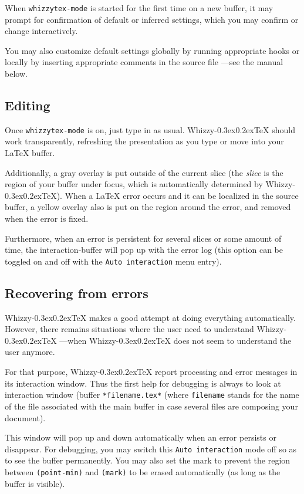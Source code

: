 \documentclass{article}
\makeatletter
\let \lst \verb
\def \whizzy {{Whizzy\kern -0.3ex\raise 0.2ex\hbox{\let \@\relax\TeX}}}
\makeatother
\begin{document}
When {\tt whizzytex-mode} is started for the first time on a new buffer, it
may prompt for confirmation of default or inferred settings, which you may
confirm or change interactively. 

You may also customize default settings globally by running appropriate
hooks or locally by inserting appropriate comments in the source file ---see
the manual below.

\subsection {Editing}

Once {\tt whizzytex-mode} is on, just type in as usual.  {\whizzy} should work
transparently, refreshing the presentation as you type or move into your
{\LaTeX} buffer. 

Additionally, a gray overlay is put outside of the current slice (the {\em
slice} is the region of your buffer under focus, which is automatically
determined by {\whizzy}). When a {\LaTeX} error occurs and it can be
localized in the source buffer, a yellow overlay also is put on the region
around the error, and removed when the error is fixed.

Furthermore, when an error is persistent for several slices or some amount
of time, the interaction-buffer will pop up with the error log
(this option can be toggled on and off with the {\tt Auto interaction} menu
entry).  

\subsection {Recovering from errors}

{\whizzy} makes a good attempt at doing everything automatically. 
However, there remains situations where the user need to understand 
{\whizzy} ---when {\whizzy} does not seem to understand the user anymore. 

For that purpose, {\whizzy} report processing and error messages
in its interaction window. Thus the first help for debugging
is always to look at interaction window (buffer 
\lst"*filename.tex*" (where \lst"filename" stands for the name of the file
associated with the main buffer in case several files are composing your
document). 

This window will pop up and down automatically when an error persists or
disappear. For debugging, you may switch this {\tt Auto interaction} mode
off so as to see the buffer permanently. You may also set the mark 
to prevent the region between \lst"(point-min)" and \lst"(mark)" to be
erased automatically (as long as the buffer is visible). 
\end{document}
